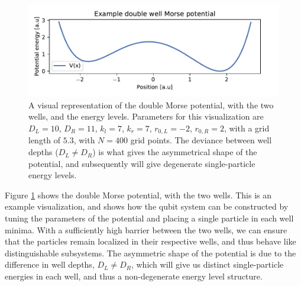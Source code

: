 \documentclass{subfiles}
\begin{document}
\begin{figure}[h!]
    \centering
    \includegraphics[width=1.0\textwidth]{figs/double_well_potential.pdf}
    \caption{A visual representation of the double Morse potential, with the two wells, and the energy levels. Parameters for this visualization are $D_L=10$, $D_R=11$, $k_l=7$, $k_r=7$, $r_{0,L}=-2$, $r_{0,R}=2$, with a grid length of $5.3$, with $N=400$ grid points. The deviance between well depths ($D_L \neq D_R$) is what gives the asymmetrical shape of the potential, and subsequently will give degenerate single-particle energy levels.} 
    \label{fig:double_well_morse_potential}
\end{figure}
Figure \ref{fig:double_well_morse_potential} shows the double Morse potential, with the two wells. This is an example visualization, and shows how the qubit system can be constructed by tuning the parameters of the potential and placing a single particle in each well minima. With a sufficiently high barrier between the two wells, we can ensure that the particles remain localized in their respective wells, and thus behave like distinguishable subsystems. The asymmetric shape of the potential is due to the difference in well depths, $D_L \neq D_R$, which will give us distinct single-particle energies in each well, and thus a non-degenerate energy level structure.  
\end{document}
